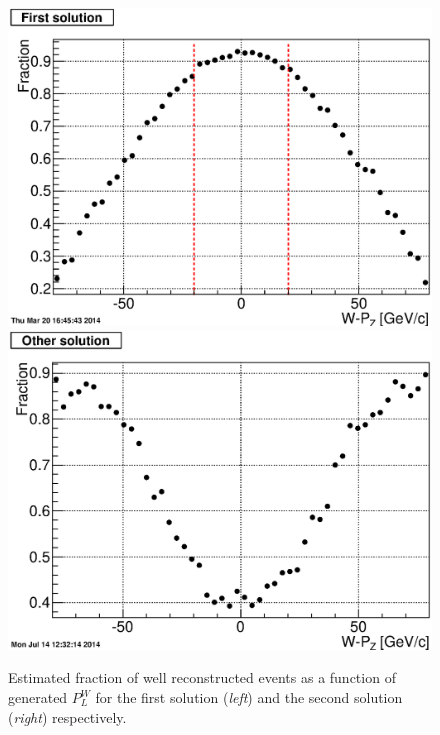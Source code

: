 \documentclass[12pt]{article}
\begin{document}
\begin{figure}[htbp]
\begin{center}
\includegraphics[scale=0.4]{images/P_long_study/hWBosonPz_GoodRecoFraction}
\includegraphics[scale=0.4]{images/P_long_study/hWBosonPz_GoodRecoFraction_OtherSol}
\end{center}
\caption{Estimated fraction of well reconstructed events as a function of generated $P^{W}_{L}$ for the first solution ({\it left}) and the second solution ({\it right}) respectively.}
\label{fig:plot_hWBosonPz_GoodRecoFraction} 
\end{figure}
\end{document}
